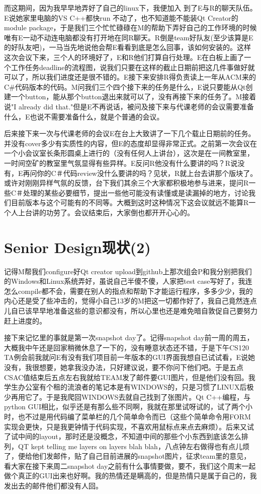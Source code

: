 \documentclass[12pt]{book}
\begin{document}
而这期间，因为我早早地弄好了自己的linux下，我便加入 到了E与R的聊天队伍。E说她家里电脑的VS C++都快run 不动了，也不知道能不能装Qt Creator的module package，于是我们三个忙忙碌碌在M的帮助下弄好自己的工作环境的时候唯有E一动不动连电脑都没有打开地在同R聊天。R倒是team好队友(至少该算是E的好队友吧)，一马当先地说他会帮E看看到底是怎么回事，该如何安装的。这样这次会议下来，三个人的环境好了，E和R他们打算自行处理。E在白板上画了一个工作任务deadline的流程图，说我们只要在这样的截止日期前把这几件事做好就可以了，所以我们进度还是很不错的。E接下来安排R得负责读上一年从ACM来的C\#代码版本的代码。M问我们三个四个接下来的任务是什么，E说只要能从Qt创建一个button，能从那个button退出来就可以了，没有再接下来的任务了。M接着说"I already did that."但是E不再说话，被问及接下来与代课老师的会议需要准备什么，E也说不需要准备什么，就是个普通的会议。

后来接下来一次与代课老师的会议E在台上大致讲了一下几个载止日期前的任务。并没有cover多少有实质性的内容，但E的态度却显得非常正式。之前第一次会议在一个小会议室长条形圆桌上进行的（没有任何人上讲台），这次是在一间教室里，一时间空矿的教室里气氛显得有些异样。E反问R他没有什么要讲的吗？R说没有，E再问你的C＃代码review没什么要讲的吗？见状，R就上台去讲那个版块了。或许对刚刚异样气氛的反馈，台下我们其余三个大家都积极地参与进来，提问R一些C＃处理的某些必要细节，提出一些他可能没有读懂或是读漏掉的地方，讨论我们目前版本与这个可能有的不同等。大概到这时这种情况下这会议就远不能算R一个人上台讲的功劳了。会议结束后，大家倒也都开开心心的。
\section{Senior Design现状(2)}
\label{sec-21-2}
记得M帮我们configure好Qt creator upload到github上那次组会P和我分别把我们的Windows和Linux系统弄好，虽说自己半傻不傻，人家把test case写好了，我连怎么compile都不会，需要在别人的指点和帮助下才能运行程序，多多少少，我的内心还是受了些冲击的，觉得小自己13岁的M把这一切都作好了，我自己竟然连点儿自已该早早地准备这些的意识都没有，所以心里也还是难免暗自敦促自己要努力赶上进度的。

接下来记忆里的事就是第一次snapshot day了。记得snapshot day前一周的周五，大概我中午还是回家稍微休息了一下的，没有睡意状态还不错，于是下午CS120 TA例会前我就问E有没有我们项目前一年版本的GUI界面我想自已试试看，E说她没有，我很想要，她拿我没办法，只好建议说，要不你问下他们吧。于是五点CSAC值结束后五点左右我就给TEAM发了邮件要GUI图片，但是他们没有回。我学生办公室有个租的流浪者的笔记本是有WINDOWS的，只是习惯了LINUX后极少再用它了。于是我爬回WINDOWS去就自己找到了张图片。Qt C++编程，与python GUI相比，似乎还是有那么些不同啊，我就在那里试呀试的，试了两个小时，也不过是用代码编了菜单栏的几个简单命令而已（这些个简单命令用FORM实现会更快，只是我更钟情于代码实现，不喜欢用鼠标点来点去麻烦）。后来又试了试中间的layout，那时还是没概念，不知道中间的那些个小东西到底该怎么排列，QT kept telling me layers on layers blah blah，八点钟左右做得也有点儿烦了，便给他们发邮件，贴了自己目前进展的snapshot图片，征求team里的意见，看大家在接下来周二snapshot day之前有什么事情要做，要不，我们这个周末一起做个真正的GUI出来也好啊。我的热情还是瞒高的，但是热情只是属于自己的，我发出去的邮件他们都没有人回。
\end{document}
